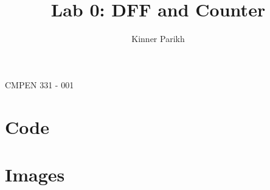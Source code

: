 \documentclass[11pt]{article}
\begin{document}
%
\author{Kinner Parikh}
\title{Lab 0: DFF and Counter}
\maketitle
\begin{center}
    CMPEN 331 - 001
\end{center}

\newpage

\section{Code}
\ttfamily


\newpage


\newpage
\rmfamily
\section{Images}
\end{document}

